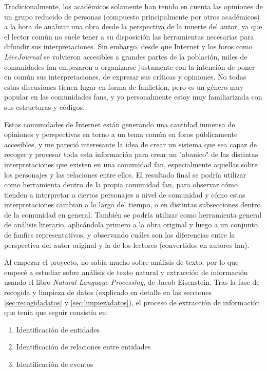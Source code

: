 \documentclass{pre-tfg}
\begin{document}
Tradicionalmente, los académicos solamente han tenido en cuenta las opiniones de un grupo reducido de personas (compuesto principalmente por otros académicos) a la hora de analizar una obra desde la perspectiva de la muerte del autor, ya que el lector común no suele tener a su disposición las herramientas necesarias para difundir sus interpretaciones. Sin embargo, desde que Internet y los foros como \textit{LiveJournal} se volvieron accesibles a grandes partes de la población, miles de comunidades fan empezaron a organizarse justamente con la intención de poner en común sus interpretaciones, de expresar sus críticas y opiniones. No todas estas discusiones tienen lugar en forma de fanfiction, pero es un género muy popular en las comunidades fans, y yo personalmente estoy muy familiarizada con sus estructuras y códigos.

Estas comunidades de Internet están generando una cantidad inmensa de opiniones y perspectivas en torno a un tema común en foros públicamente accesibles, y me pareció interesante la idea de crear un sistema que sea capaz de recoger y procesar toda esta información para crear un "abanico" de las distintas interpretaciones que existen en una comunidad fan, especialmente aquellas sobre los personajes y las relaciones entre ellos. El resultado final se podría utilizar como herramienta dentro de la propia comunidad fan, para observar cómo tienden a interpretar a ciertos personajes a nivel de comunidad y cómo estas interpretaciones cambian a lo largo del tiempo, o en distintas subsecciones dentro de la comunidad en general. También se podría utilizar como herramienta general de análisis literario, aplicándola primero a la obra original y luego a un conjunto de fanfics representativos, y observando cuáles son las diferencias entre la perspectiva del autor original y la de los lectores (convertidos en autores fan).

Al empezar el proyecto, no sabía mucho sobre análisis de texto, por lo que empecé a estudiar sobre análisis de texto natural y extracción de información usando el libro \textit{Natural Language Processing}, de Jacob Eisenstein\cite{jacob}. Tras la fase de recogida y limpieza de datos (explicado en detalle en las secciones \ref{sec:recogidadatos} y \ref{sec:limpiezadatos}), el proceso de extracción de información que tenía que seguir consistía en:


\begin{enumerate}
	\item Identificación de entidades
	\item Identificación de relaciones entre entidades
	\item Identificación de eventos
\end{enumerate}
\end{document}
